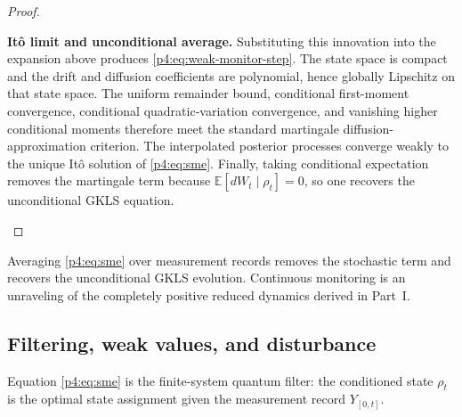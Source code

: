 \documentclass[12pt,a4paper]{article}
\begin{document}
\begin{proof}
\begin{proofsteps}
\item \textbf{It\^o limit and unconditional average.}
Substituting this innovation into the expansion above produces
\eqref{p4:eq:weak-monitor-step}.  The state space is compact and the drift
and diffusion coefficients are polynomial, hence globally Lipschitz on that
state space.  The uniform remainder bound, conditional first-moment
convergence, conditional quadratic-variation convergence, and vanishing
higher conditional moments therefore meet the standard martingale
diffusion-approximation criterion.  The interpolated posterior processes
converge weakly to the unique It\^o solution of \eqref{p4:eq:sme}.
Finally, taking conditional expectation removes the martingale term because \(\mathbb E[dW_t\mid \rho_t]=0\), so one recovers the unconditional GKLS equation.
\end{proofsteps}

\end{proof}

Averaging \eqref{p4:eq:sme} over measurement records removes the stochastic term and recovers the unconditional GKLS evolution.
Continuous monitoring is an unraveling of the completely positive reduced dynamics derived in Part~I.



\subsection{Filtering, weak values, and disturbance}
\label{p4:sec:part3-filtering}

Equation \eqref{p4:eq:sme} is the finite-system quantum filter: the conditioned state $\rho_t$ is the optimal state assignment given the measurement record $Y_{[0,t]}$.
\end{document}
